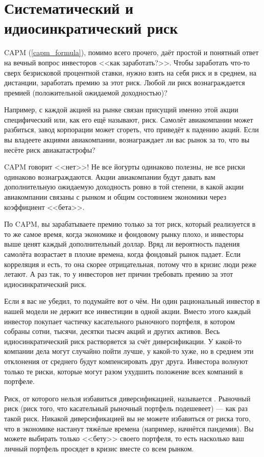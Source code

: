 \section*{Систематический и идиосинкратический риск}

CAPM (\ref{capm_formula}), помимо всего прочего, даёт простой и понятный ответ на вечный вопрос инвесторов <<как заработать?>>. Чтобы заработать что-то сверх безрисковой процентной ставки, нужно взять на себя риск и в среднем, на дистанции, заработать премию за этот риск. Любой ли риск вознаграждается премией (положительной ожидаемой доходностью)?

Например, с каждой акцией на рынке связан присущий именно этой акции специфический или, как его ещё называют,  риск. Самолёт авиакомпании может разбиться, завод корпорации может сгореть, что приведёт к падению акций. Если вы владеете акциями авиакомпании, вознаграждает ли вас рынок за то, что вы несёте риск авиакатастрофы?

CAPM говорит <<нет>>! Не все йогурты одинаково полезны, не все риски одинаково вознаграждаются. Акции авиакомпании будут давать вам дополнительную ожидаемую доходность ровно в той степени, в какой акции авиакомпании связаны с рынком и общим состоянием экономики через коэффициент <<бета>>.

По CAPM, вы зарабатываете премию только за тот риск, который реализуется в то же самое время, когда экономике и фондовому рынку плохо, и инвесторы выше ценят каждый дополнительный доллар. Вряд ли вероятность падения самолёта возрастает в плохие времена, когда фондовый рынок падает. Если корреляция и есть, то она скорее отрицательная, потому что в кризис люди реже летают. А раз так, то у инвесторов нет причин требовать премию за этот идиосинкратический риск. 

Если я вас не убедил, то подумайте вот о чём. Ни один рациональный инвестор в нашей модели не держит все инвестиции в одной акции. Вместо этого каждый инвестор покупает частичку касательного рыночного портфеля, в котором собраны сотни, тысячи, десятки тысяч акций и других активов. Весь идиосинкратический риск растворяется за счёт диверсификации. У какой-то компании дела могут случайно пойти лучше, у какой-то хуже, но в среднем эти отклонения от среднего будут компенсировать друг друга. Инвестора волнуют только те риски, которые могут разом ухудшить положение всех компаний в портфеле.

Риск, от которого нельзя избавиться диверсификацией, называется . Рыночный риск (риск того, что касательный рыночный портфель подешевеет) --- как раз такой риск. Никакой диверсификацией вы не можете избавиться от риска того, что в экономике настанут тяжёлые времена (например, начнётся пандемия). Вы можете выбирать только <<бету>> своего портфеля, то есть насколько ваш личный портфель просядет в кризис вместе со всем рынком.

